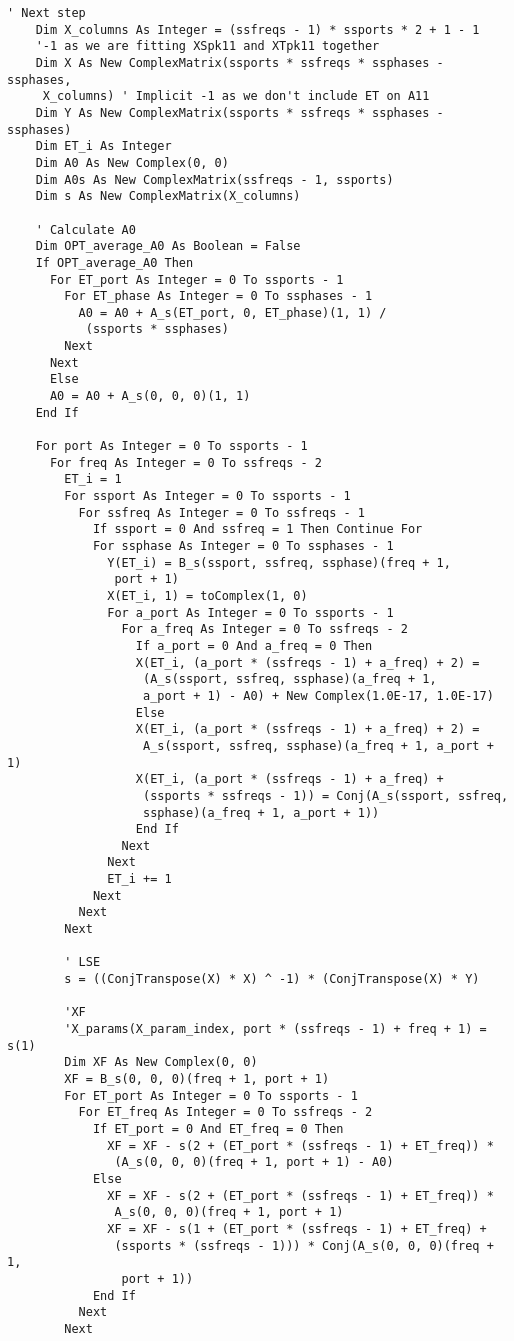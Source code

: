 \documentclass[../thesis/thesis.tex]{subfiles}
\begin{document}
\begin{lstlisting}[language=vbscript]
    ' Next step
    Dim X_columns As Integer = (ssfreqs - 1) * ssports * 2 + 1 - 1 
    '-1 as we are fitting XSpk11 and XTpk11 together
    Dim X As New ComplexMatrix(ssports * ssfreqs * ssphases - ssphases, 
     X_columns) ' Implicit -1 as we don't include ET on A11
    Dim Y As New ComplexMatrix(ssports * ssfreqs * ssphases - ssphases)
    Dim ET_i As Integer
    Dim A0 As New Complex(0, 0)
    Dim A0s As New ComplexMatrix(ssfreqs - 1, ssports)
    Dim s As New ComplexMatrix(X_columns)
    
    ' Calculate A0
    Dim OPT_average_A0 As Boolean = False
    If OPT_average_A0 Then
      For ET_port As Integer = 0 To ssports - 1
        For ET_phase As Integer = 0 To ssphases - 1
          A0 = A0 + A_s(ET_port, 0, ET_phase)(1, 1) / 
           (ssports * ssphases)
        Next
      Next
      Else
      A0 = A0 + A_s(0, 0, 0)(1, 1)
    End If
    
    For port As Integer = 0 To ssports - 1
      For freq As Integer = 0 To ssfreqs - 2
        ET_i = 1
        For ssport As Integer = 0 To ssports - 1
          For ssfreq As Integer = 0 To ssfreqs - 1
            If ssport = 0 And ssfreq = 1 Then Continue For
            For ssphase As Integer = 0 To ssphases - 1
              Y(ET_i) = B_s(ssport, ssfreq, ssphase)(freq + 1, 
               port + 1)
              X(ET_i, 1) = toComplex(1, 0)
              For a_port As Integer = 0 To ssports - 1
                For a_freq As Integer = 0 To ssfreqs - 2
                  If a_port = 0 And a_freq = 0 Then
                  X(ET_i, (a_port * (ssfreqs - 1) + a_freq) + 2) = 
                   (A_s(ssport, ssfreq, ssphase)(a_freq + 1, 
                   a_port + 1) - A0) + New Complex(1.0E-17, 1.0E-17)
                  Else
                  X(ET_i, (a_port * (ssfreqs - 1) + a_freq) + 2) = 
                   A_s(ssport, ssfreq, ssphase)(a_freq + 1, a_port + 1)
                  X(ET_i, (a_port * (ssfreqs - 1) + a_freq) + 
                   (ssports * ssfreqs - 1)) = Conj(A_s(ssport, ssfreq, 
                   ssphase)(a_freq + 1, a_port + 1))
                  End If
                Next
              Next
              ET_i += 1
            Next
          Next
        Next
        
        ' LSE
        s = ((ConjTranspose(X) * X) ^ -1) * (ConjTranspose(X) * Y)
        
        'XF
        'X_params(X_param_index, port * (ssfreqs - 1) + freq + 1) = s(1)
        Dim XF As New Complex(0, 0)
        XF = B_s(0, 0, 0)(freq + 1, port + 1)
        For ET_port As Integer = 0 To ssports - 1
          For ET_freq As Integer = 0 To ssfreqs - 2
            If ET_port = 0 And ET_freq = 0 Then
              XF = XF - s(2 + (ET_port * (ssfreqs - 1) + ET_freq)) * 
               (A_s(0, 0, 0)(freq + 1, port + 1) - A0)
            Else
              XF = XF - s(2 + (ET_port * (ssfreqs - 1) + ET_freq)) * 
               A_s(0, 0, 0)(freq + 1, port + 1)
              XF = XF - s(1 + (ET_port * (ssfreqs - 1) + ET_freq) + 
               (ssports * (ssfreqs - 1))) * Conj(A_s(0, 0, 0)(freq + 1, 
                port + 1))
            End If
          Next
        Next
        

\end{lstlisting}
\end{document}
